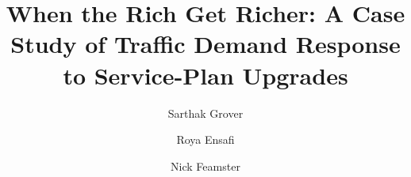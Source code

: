 \documentclass{llncs}
\begin{document}
\begin{sloppypar}

\mainmatter 

\title{When the Rich Get Richer: A Case Study of Traffic Demand Response to Service-Plan Upgrades}

\author{Sarthak Grover \and Roya Ensafi \and Nick Feamster}


\maketitle












\balance\label{lastpage}


\end{sloppypar}



\small
\setlength{\parskip}{-1pt}
\setlength{\itemsep}{-1pt}
\balance

\end{document}
